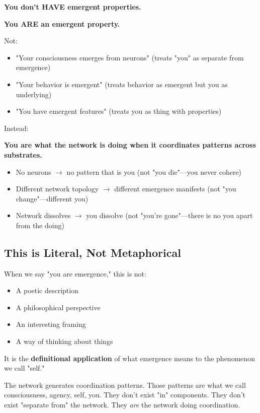 \documentclass[11pt,a4paper]{article}
\begin{document}
\textbf{You don't HAVE emergent properties.}

\textbf{You ARE an emergent property.}

Not:
\begin{itemize}
\item "Your consciousness emerges from neurons" (treats "you" as separate from emergence)
\item "Your behavior is emergent" (treats behavior as emergent but you as underlying)  
\item "You have emergent features" (treats you as thing with properties)
\end{itemize}

Instead:

\textbf{You are what the network is doing when it coordinates patterns across substrates.}

\begin{itemize}
\item No neurons $\rightarrow$ no pattern that is you (not "you die"---you never cohere)
\item Different network topology $\rightarrow$ different emergence manifests (not "you change"---different you)
\item Network dissolves $\rightarrow$ you dissolve (not "you're gone"---there is no you apart from the doing)
\end{itemize}

\subsection{This is Literal, Not Metaphorical}

When we say "you are emergence," this is not:
\begin{itemize}
\item A poetic description
\item A philosophical perspective  
\item An interesting framing
\item A way of thinking about things
\end{itemize}

It is the \textbf{definitional application} of what emergence means to the phenomenon we call "self."

The network generates coordination patterns. Those patterns are what we call consciousness, agency, self, you. They don't exist "in" components. They don't exist "separate from" the network. They \textit{are} the network doing coordination.
\end{document}
